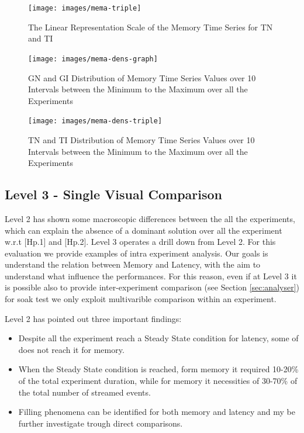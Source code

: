 \begin{figure}[hbt]
  \centering
	\texttt{[image: images/mema-triple]}
	\caption{The Linear Representation Scale of the Memory Time Series for TN and TI} 
  	\label{fig:level2-memory-triple}
\end{figure}

\begin{figure}[hbt]
  \centering
	\texttt{[image: images/mema-dens-graph]}
	\caption{GN and GI Distribution of Memory Time Series Values over 10 Intervals between the Minimum to the Maximum over all the Experiments} 
  	\label{fig:level2-memory-density-graph}
\end{figure}

\begin{figure}[hbt]
  \centering
	\texttt{[image: images/mema-dens-triple]}
	\caption{TN and TI Distribution of Memory Time Series Values over 10 Intervals between the Minimum to the Maximum over all the Experiments} 
  	\label{fig:level2-memory-density-triple}
\end{figure}

\subsection{Level 3 - Single Visual Comparison}\label{sec:eval-level3}
	
Level 2 has shown some macroscopic differences between the all the experiments, which can explain the absence of a dominant solution over all the experiment w.r.t [Hp.1] and [Hp.2]. Level 3 operates a drill down from Level 2. For this evaluation we provide examples of intra experiment analysis. Our goals is understand the relation between Memory and Latency, with the aim to understand what influence the performances. For this reason, even if at Level 3 it is possible also to provide inter-experiment comparison (see Section \ref{sec:analyser}) for soak test we only exploit multivarible comparison within an experiment.

Level 2 has pointed out three important findings:
\begin{itemize}
\item Despite all the experiment reach a Steady State condition for latency, some of does not reach it for memory.
\item When the Steady State condition is reached, form memory it required 10-20\% of the total experiment duration, while for memory it necessities of 30-70\% of the total number of streamed events.
\item Filling phenomena can be identified for both memory and latency and my be further investigate trough direct comparisons.
\end{itemize}

